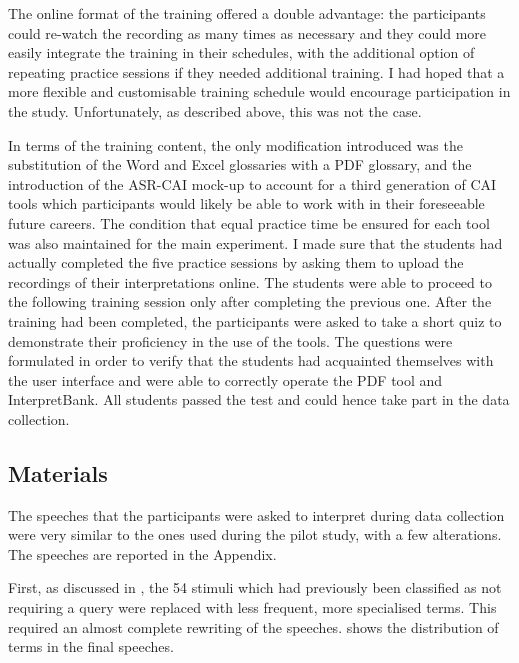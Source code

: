 The online format of the training offered a double advantage: the participants could re-watch the recording as many times as necessary and they could more easily integrate the training in their schedules, with the additional option of repeating practice sessions if they needed additional training. I had hoped that a more flexible and customisable training schedule would encourage participation in the study. Unfortunately, as described above, this was not the case.

In terms of the training content, the only modification introduced was the substitution of the Word and Excel glossaries with a PDF glossary, and the introduction of the ASR-CAI mock-up to account for a third generation of CAI tools which participants would likely be able to work with in their foreseeable future careers. The condition that equal practice time be ensured for each tool was also maintained for the main experiment. I made sure that the students had actually completed the five practice sessions by asking them to upload the recordings of their interpretations online. The students were able to proceed to the following training session only after completing the previous one. After the training had been completed, the participants were asked to take a short quiz to demonstrate their proficiency in the use of the tools. The questions were formulated in order to verify that the students had acquainted themselves with the user interface and were able to correctly operate the PDF tool and InterpretBank. All students passed the test and could hence take part in the data collection.
\subsection{Materials} \label{material_MS}
The speeches that the participants were asked to interpret during data collection were very similar to the ones used during the pilot study, with a few alterations. The speeches are reported in the Appendix.

First, as discussed in , the 54 stimuli which had previously been classified as not requiring a query were replaced with less frequent, more specialised terms. This required an almost complete rewriting of the speeches.  shows the distribution of terms in the final speeches.

